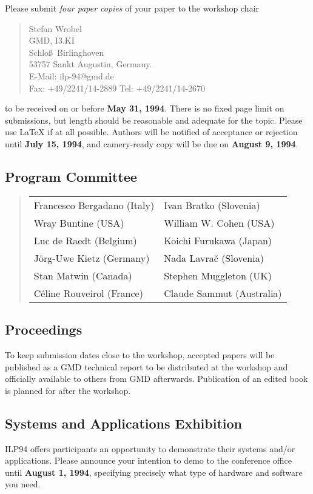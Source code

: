 Please submit {\em four paper copies} of your paper to the workshop chair
\begin{quote}
Stefan Wrobel\\
GMD, I3.KI\\
Schlo\ss\ Birlinghoven\\
53757 Sankt Augustin, Germany.\\
E-Mail: ilp-94@gmd.de\\
Fax: +49/2241/14-2889  Tel: +49/2241/14-2670
\end{quote}
to be received on or before {\bf May 31, 1994}.  There is no fixed page limit on
submissions, but length should be reasonable and adequate for the
topic.  Please use LaTeX if at all possible.  Authors will be notified of
acceptance or rejection until {\bf July 15, 1994}, and camery-ready copy will
be due on {\bf August 9, 1994}.
\subsection*{Program Committee}
\begin{quote}
\begin{tabular}{ll}
Francesco Bergadano (Italy) \hspace*{1.5cm} &
Ivan Bratko (Slovenia)\\
Wray Buntine (USA) &
William W. Cohen (USA)\\
Luc de Raedt (Belgium) &
Koichi Furukawa (Japan)\\
J\"org-Uwe Kietz (Germany) &
Nada Lavra\v{c} (Slovenia)\\
Stan Matwin (Canada) &
Stephen Muggleton (UK)\\
C\'eline Rouveirol (France) &
Claude Sammut (Australia)
\end{tabular}
\end{quote}
\subsection*{Proceedings}
To keep submission dates close to the workshop, accepted papers will
be published as a GMD technical report to be distributed at the
workshop and officially available to others from GMD afterwards.
Publication of an edited book is planned for after the workshop.
\subsection*{Systems and Applications Exhibition}
ILP94 offers participants an opportunity to demonstrate their systems
and/or applications.  Please announce your intention to demo to the
conference office until {\bf August 1, 1994}, specifying precisely
what type of hardware and software you need.
